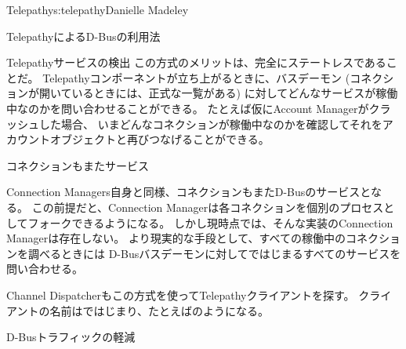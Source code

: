 \begin{aosachapter}{Telepathy}{s:telepathy}{Danielle Madeley}
\begin{aosasect1}{TelepathyによるD-Busの利用法}
\begin{aosasect2}{Telepathyサービスの検出}
この方式のメリットは、完全にステートレスであることだ。
Telepathyコンポーネントが立ち上がるときに、バスデーモン
(コネクションが開いているときには、正式な一覧がある)
に対してどんなサービスが稼働中なのかを問い合わせることができる。
たとえば仮にAccount Managerがクラッシュした場合、
いまどんなコネクションが稼働中なのかを確認してそれをアカウントオブジェクトと再びつなげることができる。

\begin{aosabox}{コネクションもまたサービス}

Connection Managers自身と同様、コネクションもまたD-Busのサービスとなる。
この前提だと、Connection Managerは各コネクションを個別のプロセスとしてフォークできるようになる。
しかし現時点では、そんな実装のConnection Managerは存在しない。
より現実的な手段として、すべての稼働中のコネクションを調べるときには
D-Busバスデーモンに対してではじまるすべてのサービスを問い合わせる。

\end{aosabox}

Channel Dispatcherもこの方式を使ってTelepathyクライアントを探す。
クライアントの名前はではじまり、たとえばのようになる。

\end{aosasect2}

\begin{aosasect2}{D-Busトラフィックの軽減}


\end{aosasect2}
\end{aosasect1}
\end{aosachapter}
